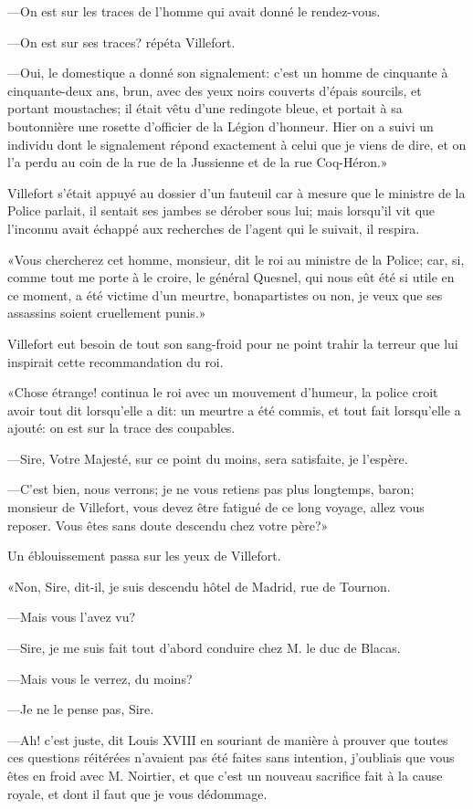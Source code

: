 —On est sur les traces de l'homme qui avait donné le rendez-vous.

—On est sur ses traces? répéta Villefort.

—Oui, le domestique a donné son signalement: c'est un homme de cinquante à cinquante-deux ans, brun, avec des yeux noirs couverts d'épais sourcils, et portant moustaches; il était vêtu d'une redingote bleue, et portait à sa boutonnière une rosette d'officier de la Légion d'honneur. Hier on a suivi un individu dont le signalement répond exactement à celui que je viens de dire, et on l'a perdu au coin de la rue de la Jussienne et de la rue Coq-Héron.»

Villefort s'était appuyé au dossier d'un fauteuil car à mesure que le ministre de la Police parlait, il sentait ses jambes se dérober sous lui; mais lorsqu'il vit que l'inconnu avait échappé aux recherches de l'agent qui le suivait, il respira.

«Vous chercherez cet homme, monsieur, dit le roi au ministre de la Police; car, si, comme tout me porte à le croire, le général Quesnel, qui nous eût été si utile en ce moment, a été victime d'un meurtre, bonapartistes ou non, je veux que ses assassins soient cruellement punis.»

Villefort eut besoin de tout son sang-froid pour ne point trahir la terreur que lui inspirait cette recommandation du roi.

«Chose étrange! continua le roi avec un mouvement d'humeur, la police croit avoir tout dit lorsqu'elle a dit: un meurtre a été commis, et tout fait lorsqu'elle a ajouté: on est sur la trace des coupables.

—Sire, Votre Majesté, sur ce point du moins, sera satisfaite, je l'espère.

—C'est bien, nous verrons; je ne vous retiens pas plus longtemps, baron; monsieur de Villefort, vous devez être fatigué de ce long voyage, allez vous reposer. Vous êtes sans doute descendu chez votre père?»

Un éblouissement passa sur les yeux de Villefort.

«Non, Sire, dit-il, je suis descendu hôtel de Madrid, rue de Tournon.

—Mais vous l'avez vu?

—Sire, je me suis fait tout d'abord conduire chez M. le duc de Blacas.

—Mais vous le verrez, du moins?

—Je ne le pense pas, Sire.

—Ah! c'est juste, dit Louis XVIII en souriant de manière à prouver que toutes ces questions réitérées n'avaient pas été faites sans intention, j'oubliais que vous êtes en froid avec M. Noirtier, et que c'est un nouveau sacrifice fait à la cause royale, et dont il faut que je vous dédommage.

